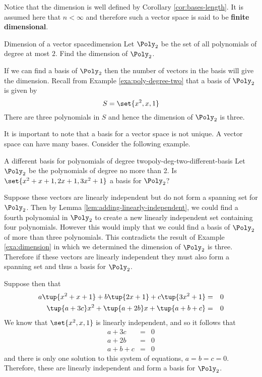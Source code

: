 Notice that the dimension is well defined by Corollary \ref{cor:bases-length}. It is assumed here
that $n<\infty $ and therefore such a vector space is said to be \textbf{finite
dimensional}.

\begin{example}{Dimension of a vector space}{dimension}
Let $\Poly_2$ be the set of all polynomials of degree at most $2$. Find the dimension of $\Poly_2$. 
\end{example}

\begin{solution}
If we can find a basis of $\Poly_2$ then the number of vectors in the basis will give the dimension. Recall from Example \ref{exa:poly-degree-two} that a basis of $\Poly_2$ is given by 
\[
S  = \set{x^2, x, 1 }
\]
There are three polynomials in $S$ and hence the dimension of $\Poly_2$ is three. 
\end{solution}

It is important to note that a basis for a vector space is not unique. A vector space can have many bases. Consider the following example.

\begin{example}{A different basis for polynomials of degree two}{poly-deg-two-different-basis}
Let $\Poly_2$ be the polynomials of degree no more than 2. Is $\set{
x^{2}+x+1,2x+1,3x^{2}+1} $ a basis for $\Poly_2$?
\end{example}

\begin{solution}
Suppose these vectors are linearly independent but do not form a spanning set for $\Poly_2$. Then by Lemma \ref{lem:adding-linearly-independent}, we could find a fourth polynomial in $\Poly_2$ to create a new linearly independent 
set containing four polynomials. However this would imply that we could find a basis of $\Poly_2$ of more than three polynomials. This contradicts the result of Example \ref{exa:dimension} in which we determined the dimension of $\Poly_2$ is three.  Therefore if these vectors are linearly independent they must also form a spanning set and thus a basis for $\Poly_2$. 

Suppose then that 
\begin{eqnarray*}
a\tup{x^{2}+x+1} +b\tup{2x+1} +c\tup{3x^{2}+1} &=& 0\\
\tup{a+3c} x^{2}+\tup{a+2b} x+\tup{a+b+c} &=& 0 
\end{eqnarray*}
We know that $\set{x^2, x, 1 }$ is linearly independent, and so it follows that  
\begin{eqnarray*}
a+3c &=& 0 \\
a+2b &=& 0 \\
a+b+c &=& 0
\end{eqnarray*}
and there is only one solution to this system of equations, $a=b=c=0$.
Therefore, these are linearly independent and form a basis for $\Poly_2$.
\end{solution}

